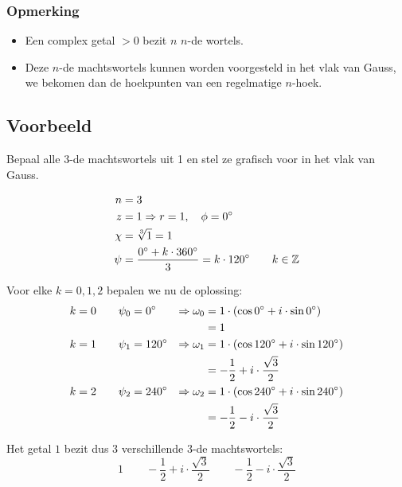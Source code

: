 \documentclass[12pt,twoside,a4]{article}
\begin{document}
\subsubsection*{Opmerking}
\begin{itemize}
\item Een complex getal $>0$ bezit $n$ $n$-de wortels.
\item Deze $n$-de machtswortels kunnen worden voorgesteld in het vlak van Gauss, we bekomen dan de hoekpunten van een regelmatige $n$-hoek.
\end{itemize}

\subsection{Voorbeeld}

Bepaal alle $3$-de machtswortels uit 1 en stel ze grafisch voor in het vlak van Gauss.

\begin{align*}
  n &= 3\\
  z &= 1 \Rightarrow r = 1, \quad \phi = 0^\circ\\
  \chi &= \sqrt[3]{1} = 1\\
  \psi &= \dfrac{0^\circ + k \cdot 360^\circ}{3} = k \cdot 120^\circ \qquad k\in\mathbb{Z}
\end{align*}

Voor elke $k=0, 1, 2$ bepalen we nu de oplossing:
\begin{align*}
  k=0 \qquad \psi_0 &= 0^\circ   &\Rightarrow \omega_0 &= 1 \cdot (\cos 0^\circ + i \cdot \sin 0^\circ)\\
            &             &       &= 1\\
  k=1 \qquad \psi_1 &= 120^\circ &\Rightarrow \omega_1 &= 1 \cdot (\cos 120^\circ + i \cdot \sin 120^\circ)\\
            &             &       &= -\dfrac{1}{2} + i \cdot \dfrac{\sqrt{3}}{2}\\
  k=2 \qquad \psi_2 &= 240^\circ &\Rightarrow \omega_2 &= 1 \cdot (\cos 240^\circ + i \cdot \sin 240^\circ)\\
            &             &       &= -\dfrac{1}{2} - i \cdot \dfrac{\sqrt{3}}{2}\\
\end{align*}

Het getal $1$ bezit dus $3$ verschillende $3$-de machtswortels:
\[1 \qquad -\dfrac{1}{2} + i \cdot \dfrac{\sqrt{3}}{2} \qquad -\dfrac{1}{2} - i \cdot \dfrac{\sqrt{3}}{2}\]
\end{document}
